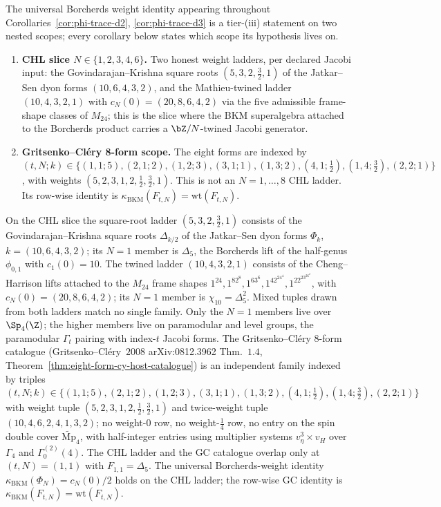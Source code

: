 \begin{remark}[Two scopes for \texorpdfstring{$\kappa_{\mathrm{BKM}}(\Phi_N) = c_N(0)/2$}{kappa-BKM(Phi-N) = c-N(0)/2}]
\label{rem:phi-trace-bkm-two-scopes}
The universal Borcherds weight identity appearing throughout
Corollaries~\ref{cor:phi-trace-d2}, \ref{cor:phi-trace-d3} is a
tier-(iii) statement on two nested scopes; every corollary below
states which scope its hypothesis lives on.
\begin{enumerate}[label=\textup{(\roman*)}]
\item \textbf{CHL slice $N \in \{1, 2, 3, 4, 6\}$.} Two honest weight
ladders, per declared Jacobi input: the Govindarajan--Krishna square
roots $(5, 3, 2, \tfrac32, 1)$ of the Jatkar--Sen dyon forms
$(10, 6, 4, 3, 2)$, and the Mathieu-twined ladder $(10, 4, 3, 2, 1)$
with $c_N(0) = (20, 8, 6, 4, 2)$ via the five admissible frame-shape
classes of $M_{24}$; this is the slice where the BKM superalgebra
attached to the Borcherds product carries a $\bZ/N$-twined Jacobi
generator.
\item \textbf{Gritsenko--Cléry 8-form scope.}
The eight forms are indexed by
\((t,N;k) \in
\{(1,1;5),(2,1;2),(1,2;3),(3,1;1),(1,3;2),
(4,1;\tfrac12),(1,4;\tfrac32),(2,2;1)\}\), with weights
\((5,2,3,1,2,\tfrac12,\tfrac32,1)\). This is not an \(N=1,\ldots,8\)
CHL ladder. Its row-wise identity is
\(\kappa_{\mathrm{BKM}}(F_{t,N})=\mathrm{wt}(F_{t,N})\).
\end{enumerate}
On the CHL slice the square-root ladder $(5, 3, 2, \tfrac32, 1)$ consists of the Govindarajan--Krishna square roots $\Delta_{k/2}$ of the Jatkar--Sen dyon forms $\Phi_k$, $k = (10, 6, 4, 3, 2)$; its $N = 1$ member is $\Delta_5$, the Borcherds lift of the half-genus $\phi_{0,1}$ with $c_1(0) = 10$. The twined ladder $(10, 4, 3, 2, 1)$ consists of the Cheng--Harrison lifts attached to the $M_{24}$ frame shapes $1^{24}, 1^82^8, 1^63^6, 1^42^24^4, 1^22^23^26^2$, with $c_N(0) = (20, 8, 6, 4, 2)$; its $N = 1$ member is $\chi_{10} = \Delta_5^2$. Mixed tuples drawn from both ladders match no single family. Only the $N = 1$ members live over $\Sp_4(\Z)$; the higher members live on paramodular and level groups, the paramodular $\Gamma_t$ pairing with index-$t$ Jacobi forms. The Gritsenko--Cl\'ery 8-form catalogue (Gritsenko--Cl\'ery~$2008$ arXiv:0812.3962 Thm.~$1.4$, Theorem~\ref{thm:eight-form-cy-host-catalogue}) is an independent family indexed by triples $(t, N; k) \in \{(1,1;5),(2,1;2),(1,2;3),(3,1;1),(1,3;2),(4,1;\tfrac12),(1,4;\tfrac32),(2,2;1)\}$ with weight tuple $(5, 2, 3, 1, 2, \tfrac12, \tfrac32, 1)$ and twice-weight tuple $(10, 4, 6, 2, 4, 1, 3, 2)$; no weight-$0$ row, no weight-$\tfrac14$ row, no entry on the spin double cover $\widetilde{\mathrm{Mp}}_4$, with half-integer entries using multiplier systems $v_\eta^3 \times v_H$ over $\Gamma_4$ and $\Gamma_0^{(2)}(4)$. The CHL ladder and the GC catalogue overlap only at $(t, N) = (1, 1)$ with $F_{1, 1} = \Delta_5$. The universal Borcherds-weight identity $\kappa_{\mathrm{BKM}}(\Phi_N) = c_N(0)/2$ holds on the CHL ladder; the row-wise GC identity is $\kappa_{\mathrm{BKM}}(F_{t, N}) = \mathrm{wt}(F_{t, N})$.
\end{remark}


